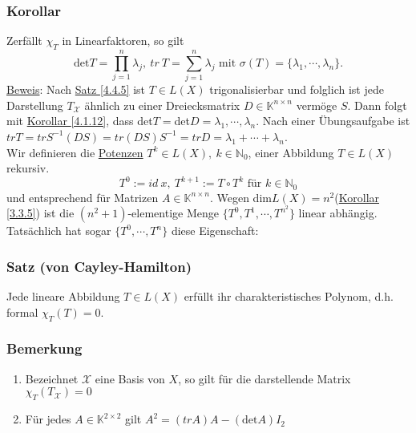 \subsubsection{Korollar}
Zerfällt $\chi _T$ in Linearfaktoren, so gilt
\[\mathrm{det}T=\prod _{j=1}^n \lambda _j,\ tr\ T=\sum _{j=1}^n \lambda _j\text{ mit }\sigma (T)=\{\lambda _1,\cdots ,\lambda _n\}.\]
\underline{Beweis}:  Nach \hyperref[4.4.5]{Satz \ref{4.4.5}} ist $T\in L(X)$ trigonalisierbar und folglich ist jede Darstellung $T_\mathcal{X}$ ähnlich zu einer Dreiecksmatrix $D\in \mathbb{K}^{n\times n}$ vermöge $S$.  Dann folgt mit \hyperref[4.1.12]{Korollar \ref{4.1.12}}, dass det$T=$det$D=\lambda _1,\cdots ,\lambda _n$.  Nach einer Übungsaufgabe ist $trT=trS^{-1}(DS)=tr(DS)S^{-1}=trD=\lambda _1+\cdots +\lambda _n$.\\
Wir definieren die \underline{Potenzen} $T^k\in L(X),\ k\in\mathbb{N}_0$, einer Abbildung $T\in L(X)$ rekursiv.
\[T^0:=id\ x,\ T^{k+1}:=T\circ T^k\text{ für }k\in\mathbb{N}_0\]
und entsprechend für Matrizen $A\in \mathbb{K}^{n\times n}$.  Wegen dim$L(X)=n^2$(\hyperref[3.3.5]{Korollar \ref{3.3.5}}) ist die $(n^2+1)$-elementige Menge $\{T^0, T^1,\cdots ,T^{n^2}\}$ linear abhängig.  Tatsächlich hat sogar $\{T^0,\cdots ,T^n\}$ diese Eigenschaft:
\subsubsection{Satz (von Cayley-Hamilton)}
Jede lineare Abbildung $T\in L(X)$ erfüllt ihr charakteristisches Polynom, d.h. formal $\chi _T(T)=0$.
\subsubsection{Bemerkung}
\begin{enumerate}
\item Bezeichnet $\mathcal{X}$ eine Basis von $X$, so gilt für die darstellende Matrix $\chi _T(T_\mathcal{X})=0$
\item Für jedes $A\in\mathbb{K}^{2\times 2}$ gilt $A^2=(trA)A-(\mathrm{det}A)I_2$
\end{enumerate}